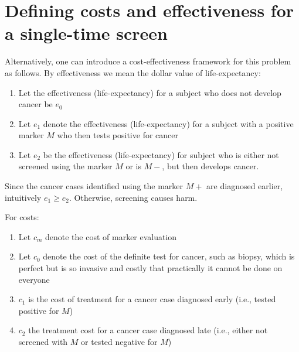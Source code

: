 \documentclass[11pt]{article}
\begin{document}
\section{Defining costs and effectiveness for a single-time screen} 

Alternatively, one can introduce a cost-effectiveness framework for this problem as follows.  By effectiveness we mean the dollar value of life-expectancy:
\begin{enumerate}
\item Let the effectiveness (life-expectancy) for a subject who does not develop cancer be $e_0$
\item Let $e_1$ denote the effectiveness (life-expectancy) for a subject with a positive marker $M$ who then tests positive for cancer
\item Let $e_2$ be the effectiveness (life-expectancy) for subject who is either not screened using the marker $M$ or is $M-$, but then develops cancer.
\end{enumerate}
Since the cancer cases identified using the marker $M+$ are diagnosed earlier, intuitively $e_1 \ge e_2$.  Otherwise, screening causes harm. 

For costs:
\begin{enumerate}
\item Let $c_m$ denote the cost of marker evaluation
\item Let $c_0$ denote the cost of the definite test for cancer, such as biopsy, which is perfect but is so invasive and costly that practically it cannot be done on everyone
\item $c_1$ is the cost of treatment for a cancer case diagnosed early (i.e., tested positive for $M$)
\item $c_2$ the treatment cost for a cancer case diagnosed late (i.e., either not screened with $M$ or tested negative for $M$)
\end{enumerate}
\end{document}

